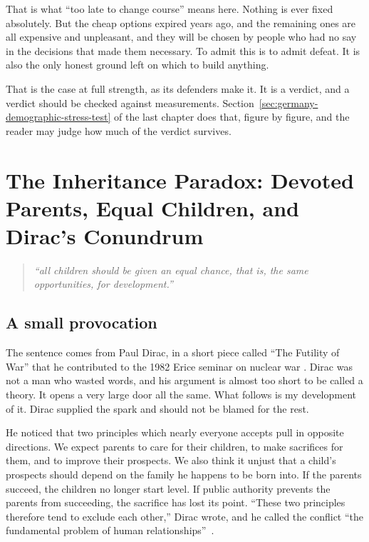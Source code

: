 \documentclass[12pt,a4paper]{book}
\begin{document}
That is what ``too late to change course'' means here. Nothing is ever fixed absolutely. But the cheap options expired years ago, and the remaining ones are all expensive and unpleasant, and they will be chosen by people who had no say in the decisions that made them necessary. To admit this is to admit defeat. It is also the only honest ground left on which to build anything.

That is the case at full strength, as its defenders make it. It is a verdict, and a verdict should be checked against measurements. Section~\ref{sec:germany-demographic-stress-test} of the last chapter does that, figure by figure, and the reader may judge how much of the verdict survives.


\chapter[The Inheritance Paradox]{The Inheritance Paradox: Devoted Parents, Equal Children, and Dirac's Conundrum}
\label{chap:inheritance-paradox}

\begin{quote}
\itshape
``all children should be given an equal chance, that is, the same
opportunities, for development.''
\end{quote}

\section{A small provocation}

The sentence comes from Paul Dirac, in a short piece called ``The Futility of War'' that he contributed to the 1982 Erice seminar on nuclear war \cite[pp.~173--174]{dirac-81}. Dirac was not a man who wasted words, and his argument is almost too short to be called a theory. It opens a very large door all the same. What follows is my development of it. Dirac supplied the spark and should not be blamed for the rest.

He noticed that two principles which nearly everyone accepts pull in opposite directions. We expect parents to care for their children, to make sacrifices for them, and to improve their prospects. We also think it unjust that a child's prospects should depend on the family he happens to be born into. If the parents succeed, the children no longer start level. If public authority prevents the parents from succeeding, the sacrifice has lost its point. ``These two principles therefore tend to exclude each other,'' Dirac wrote, and he called the conflict ``the fundamental problem of human relationships''~\cite[p.~174]{dirac-81}.
\end{document}
